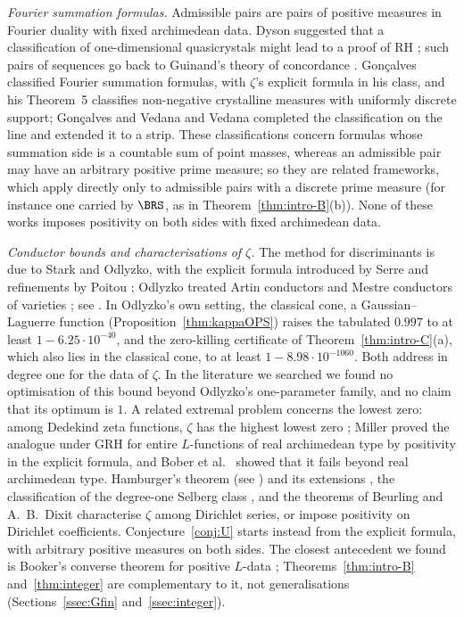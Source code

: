 \emph{Fourier summation formulas.} Admissible pairs are pairs of positive measures in Fourier duality with fixed archimedean data.
Dyson suggested that a classification of one-dimensional quasicrystals might lead to a proof of RH \cite{Dys09}; such pairs of
sequences go back to Guinand's theory of concordance \cite{Gui59}. Gon\c{c}alves \cite{Gon23} classified Fourier summation formulas,
with $\zeta$'s explicit formula in his class, and his Theorem~5 classifies non-negative crystalline measures with uniformly discrete
support; Gon\c{c}alves and
Vedana \cite{GV25} and Vedana \cite{Ved26} completed the classification on the line and extended it to a strip. These classifications
concern formulas whose summation side is a countable sum of point masses, whereas an admissible pair may have an arbitrary positive prime
measure; so they are related frameworks, which apply directly only to admissible pairs with a discrete prime measure (for instance one
carried by $\BRS$, as in Theorem~\ref{thm:intro-B}(b)). None of these works imposes positivity on both sides with fixed archimedean data.

\emph{Conductor bounds and characterisations of $\zeta$.} The method for discriminants is due to Stark and Odlyzko, with the explicit
formula introduced by Serre and refinements by Poitou \cite{Sta74,Odl76,Ser75,Poi77,Poi77b}; Odlyzko treated Artin conductors \cite{Odl77}
and Mestre conductors of varieties \cite{Mes86}; see \cite{Odl90,DyD80}. In Odlyzko's own setting, the classical cone, a Gaussian--Laguerre
function (Proposition~\ref{thm:kappaOPS}) raises the tabulated $0.997$ to at least $1-6.25\cdot10^{-40}$, and the zero-killing certificate of
Theorem~\ref{thm:intro-C}(a), which also lies in the classical cone, to at least $1-8.98\cdot10^{-1060}$. Both address \cite[Open Problem~2.2]{Odl90} in degree one for the data of $\zeta$. In the literature we
searched we found no optimisation of this bound beyond Odlyzko's one-parameter family, and no claim that its optimum is $1$. A related
extremal problem concerns the lowest zero: among Dedekind zeta functions, $\zeta$ has the highest lowest zero \cite[p.~132]{Odl90};
Miller \cite{Mil02} proved the analogue under GRH for entire $L$-functions of real archimedean type by positivity in the explicit
formula, and Bober et al.\ \cite{Bob15} showed that it fails beyond real archimedean type.
Hamburger's theorem \cite{Ham21,Ham21b} (see \cite{Per17,Bur12}) and its extensions \cite{Boc58,Kno94,Kno00}, the classification of the
degree-one Selberg class \cite{Sel92,CG93,KP99,Sou05}, and the theorems of Beurling \cite{Beu51} and A.~B.~Dixit \cite{DixA20}
characterise $\zeta$ among Dirichlet series, or impose positivity on Dirichlet coefficients. Conjecture~\ref{conj:U} starts instead from
the explicit formula, with arbitrary positive measures on both sides. The closest antecedent we found is Booker's converse theorem for
positive $L$-data \cite[Definition~1.3, Theorem~1.7]{Boo15}; Theorems~\ref{thm:intro-B} and~\ref{thm:integer} are complementary to it, not
generalisations (Sections~\ref{ssec:Gfin} and~\ref{ssec:integer}).

